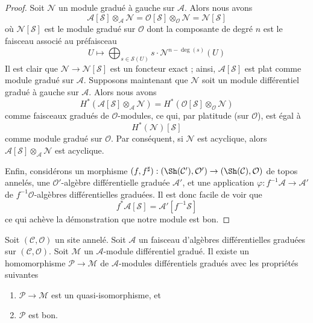 \begin{proof}
Soit $\mathcal{N}$ un module gradué à gauche sur $\mathcal{A}$.
Alors nous avons
$$
\mathcal{A}[\mathcal{S}] \otimes_\mathcal{A} \mathcal{N} =
\mathcal{O}[\mathcal{S}] \otimes_\mathcal{O} \mathcal{N} =
\mathcal{N}[\mathcal{S}]
$$
où $\mathcal{N}[\mathcal{S}]$ est le module gradué sur $\mathcal{O}$ dont la composante de degré $n$ est le faisceau associé au préfaisceau
$$
U \longmapsto
\bigoplus\nolimits_{s \in \mathcal{S}(U)} s \cdot \mathcal{N}^{n - \deg(s)}(U)
$$
Il est clair que $\mathcal{N} \to \mathcal{N}[\mathcal{S}]$ est un foncteur exact ; ainsi, $\mathcal{A}[\mathcal{S}]$ est plat comme module gradué sur $\mathcal{A}$.
Supposons maintenant que $\mathcal{N}$ soit un module différentiel gradué à gauche sur $\mathcal{A}$.
Alors nous avons
$$
H^*(\mathcal{A}[\mathcal{S}] \otimes_\mathcal{A} \mathcal{N}) =
H^*(\mathcal{O}[\mathcal{S}] \otimes_\mathcal{O} \mathcal{N})
$$
comme faisceaux gradués de $\mathcal{O}$-modules, ce qui, par platitude (sur $\mathcal{O}$), est égal à
$$
H^*(\mathcal{N})[\mathcal{S}]
$$
comme module gradué sur $\mathcal{O}$.
Par conséquent, si $\mathcal{N}$ est acyclique, alors $\mathcal{A}[\mathcal{S}] \otimes_\mathcal{A} \mathcal{N}$ est acyclique.

\medskip\noindent
Enfin, considérons un morphisme $(f, f^\sharp) : (\Sh(\mathcal{C}'), \mathcal{O}') \to (\Sh(\mathcal{C}), \mathcal{O})$ de topos annelés, une $\mathcal{O}'$-algèbre différentielle graduée $\mathcal{A}'$, et une application $\varphi : f^{-1}\mathcal{A} \to \mathcal{A}'$ de $f^{-1}\mathcal{O}$-algèbres différentielles graduées.
Il est donc facile de voir que
$$
f^*\mathcal{A}[\mathcal{S}] = \mathcal{A}'[f^{-1}\mathcal{S}]
$$
ce qui achève la démonstration que notre module est bon.
\end{proof}

\begin{lemma}
\label{lemma-resolve}
Soit $(\mathcal{C}, \mathcal{O})$ un site annelé.
Soit $\mathcal{A}$ un faisceau d'algèbres différentielles graduées sur $(\mathcal{C}, \mathcal{O})$.
Soit $\mathcal{M}$ un $\mathcal{A}$-module différentiel gradué.
Il existe un homomorphisme $\mathcal{P} \to \mathcal{M}$ de $\mathcal{A}$-modules différentiels gradués avec les propriétés suivantes
\begin{enumerate}
\item $\mathcal{P} \to \mathcal{M}$ est un quasi-isomorphisme, et \item $\mathcal{P}$ est bon.
\end{enumerate}
\end{lemma}

